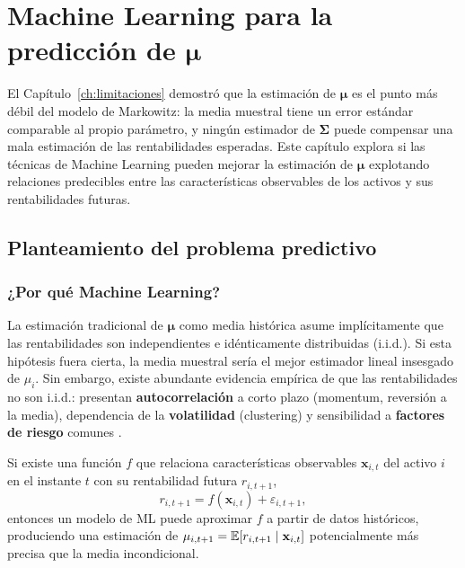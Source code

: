 \chapter{Machine Learning para la predicción de \texorpdfstring{$\boldsymbol{\mu}$}{μ}}
\label{ch:ml}

El Capítulo~\ref{ch:limitaciones} demostró que la estimación de
$\boldsymbol{\mu}$ es el punto más débil del modelo de Markowitz: la media
muestral tiene un error estándar comparable al propio parámetro, y ningún
estimador de $\boldsymbol{\Sigma}$ puede compensar una mala estimación de las
rentabilidades esperadas. Este capítulo explora si las técnicas de Machine
Learning pueden mejorar la estimación de $\boldsymbol{\mu}$ explotando
relaciones predecibles entre las características observables de los activos
y sus rentabilidades futuras.

\section{Planteamiento del problema predictivo}

\subsection{¿Por qué Machine Learning?}

La estimación tradicional de $\boldsymbol{\mu}$ como media histórica asume
implícitamente que las rentabilidades son independientes e idénticamente
distribuidas (i.i.d.). Si esta hipótesis fuera cierta, la media muestral sería
el mejor estimador lineal insesgado de $\mu_i$. Sin embargo, existe
abundante evidencia empírica de que las rentabilidades no son i.i.d.:
presentan \textbf{autocorrelación} a corto plazo (momentum, reversión a la
media), dependencia de la \textbf{volatilidad} (clustering) y sensibilidad a
\textbf{factores de riesgo} comunes \cite{Cont2001}.

Si existe una función $f$ que relaciona características observables
$\mathbf{x}_{i,t}$ del activo $i$ en el instante $t$ con su rentabilidad
futura $r_{i,t+1}$,
\begin{equation}
    r_{i,t+1} = f(\mathbf{x}_{i,t}) + \varepsilon_{i,t+1},
    \label{eq:ml-model}
\end{equation}
entonces un modelo de ML puede aproximar $f$ a partir de datos históricos,
produciendo una estimación de $\mu_{i,t+1} = \mathbb{E}[r_{i,t+1} \mid
\mathbf{x}_{i,t}]$ potencialmente más precisa que la media incondicional.

